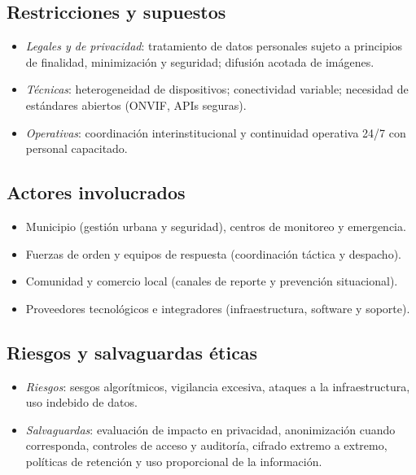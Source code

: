 \documentclass[12pt,a4paper]{article}
\begin{document}
\subsection*{Restricciones y supuestos}
\begin{itemize}
    \item \textit{Legales y de privacidad}: tratamiento de datos personales sujeto a principios de finalidad, minimización y seguridad; difusión acotada de imágenes.
    \item \textit{Técnicas}: heterogeneidad de dispositivos; conectividad variable; necesidad de estándares abiertos (ONVIF, APIs seguras).
    \item \textit{Operativas}: coordinación interinstitucional y continuidad operativa 24/7 con personal capacitado.
\end{itemize}

\subsection*{Actores involucrados}
\begin{itemize}
    \item Municipio (gestión urbana y seguridad), centros de monitoreo y emergencia.
    \item Fuerzas de orden y equipos de respuesta (coordinación táctica y despacho).
    \item Comunidad y comercio local (canales de reporte y prevención situacional).
    \item Proveedores tecnológicos e integradores (infraestructura, software y soporte).
\end{itemize}

\subsection*{Riesgos y salvaguardas éticas}
\begin{itemize}
    \item \textit{Riesgos}: sesgos algorítmicos, vigilancia excesiva, ataques a la infraestructura, uso indebido de datos.
    \item \textit{Salvaguardas}: evaluación de impacto en privacidad, anonimización cuando corresponda, controles de acceso y auditoría, cifrado extremo a extremo, políticas de retención y uso proporcional de la información.
\end{itemize}
\end{document}
